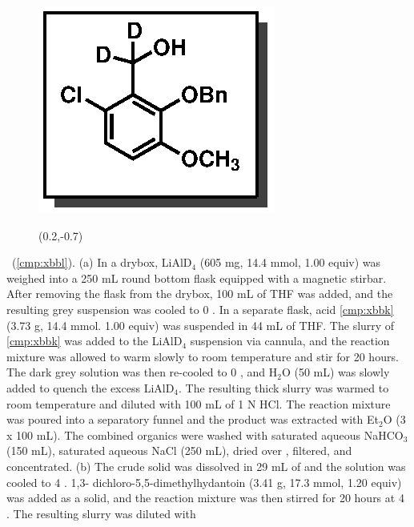 \vspace{10pt}
\begin{figure}
  \vspace{-25pt}
  \begin{center}
    \includegraphics[scale=0.8]{chp_singlecarbon/images/xbbl}
    \begin{textblock}{1}(0.2,-0.7)  \end{textblock}
  \end{center}
  \vspace{-30pt}
\end{figure}\noindent \textbf{\CMPxbbl}\ (\ref{cmp:xbbl}). (a) In a drybox, LiAlD$_4$ (605 mg,
14.4 mmol, 1.00 equiv) was weighed into a 250 mL round bottom flask equipped with a magnetic
stirbar. After removing the flask from the drybox, 100 mL of THF was added, and the resulting grey
suspension was cooled to 0 \degc. In a separate flask, acid \ref{cmp:xbbk} (3.73 g, 14.4 mmol. 1.00
equiv) was suspended in 44 mL of THF. The slurry of \ref{cmp:xbbk} was added to the LiAlD$_4$
suspension via cannula, and the reaction mixture was allowed to warm slowly to room temperature and stir for 20 hours. The dark grey solution was
then re-cooled to 0 \degc, and H$_2$O (50 mL) was slowly added to quench the excess LiAlD$_4$. The
resulting thick slurry was warmed to room temperature and diluted with 100 mL of 1 N HCl. The
reaction mixture was poured into a separatory funnel and the product was extracted with Et$_2$O (3
x 100 mL). The combined organics were washed with saturated aqueous NaHCO$_3$ (150 mL),
saturated aqueous NaCl (250 mL), dried over , filtered, and concentrated.
(b) The crude solid was dissolved in 29 mL of  and the solution was cooled to 4 \degc.
1,3- dichloro-5,5-dimethylhydantoin (3.41 g, 17.3 mmol, 1.20 equiv) was added as a solid, and the
reaction mixture was then stirred for 20 hours at 4 \degc. The resulting slurry was diluted with
